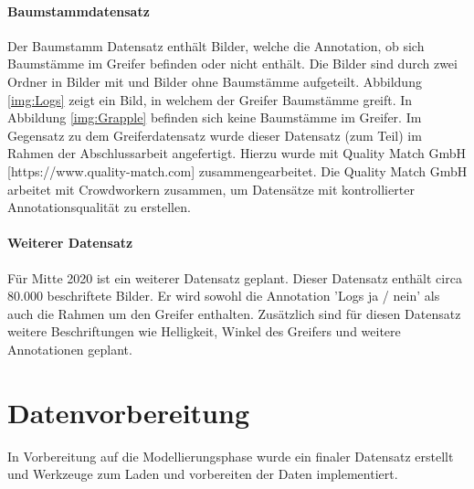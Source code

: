 	\paragraph{Baumstammdatensatz} Der Baumstamm Datensatz enthält Bilder, welche die Annotation, ob sich Baumstämme im Greifer befinden oder nicht enthält. Die Bilder sind durch zwei Ordner in Bilder mit und Bilder ohne Baumstämme aufgeteilt. Abbildung \ref{img:Logs} zeigt ein Bild, in welchem der Greifer Baumstämme greift. In Abbildung \ref{img:Grapple} befinden sich keine Baumstämme im Greifer.
	Im Gegensatz zu dem Greiferdatensatz wurde dieser Datensatz (zum Teil) im Rahmen der Abschlussarbeit angefertigt. Hierzu wurde mit Quality Match GmbH [https://www.quality-match.com] zusammengearbeitet. Die Quality Match GmbH arbeitet mit Crowdworkern zusammen, um Datensätze mit kontrollierter Annotationsqualität zu erstellen.  

	\paragraph{Weiterer Datensatz} Für Mitte 2020 ist ein weiterer Datensatz geplant. Dieser Datensatz enthält circa 80.000 beschriftete Bilder. Er wird sowohl die Annotation 'Logs ja / nein' als auch die Rahmen um den Greifer enthalten. Zusätzlich sind für diesen Datensatz weitere Beschriftungen wie Helligkeit, Winkel des Greifers und weitere Annotationen geplant. 
			
	\section{Datenvorbereitung}
	\label{sec:DataPreparation}
	In Vorbereitung auf die Modellierungsphase wurde ein finaler Datensatz erstellt und Werkzeuge zum Laden und vorbereiten der Daten implementiert.
